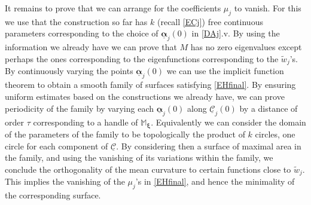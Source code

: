 \documentclass[12pt,namelimits,sumlimits]{amsart}
\theoremstyle{remark}
\numberwithin{equation}{section}
\begin{document}
It remains to prove that we can arrange for the coefficients $\mu_j$ to vanish.
For this we use that the construction so far has $k$
(recall \ref{ECj})
free continuous parameters corresponding to the choice of 
${\underline{\boldsymbol{\alpha}}}_j(0)$ in \ref{DAj}.v.
By using the information we already have we can prove that $M$ has
no zero eigenvalues except perhaps the ones corresponding to the eigenfunctions
corresponding to the $\widetilde{w}_j$'s.
By continuously varying the points ${\underline{\boldsymbol{\alpha}}}_j(0)$ we can use the implicit function theorem to obtain a smooth
family of surfaces satisfying \ref{EHfinal}.
By ensuring uniform estimates based on the constructions we already have,
we can prove
periodicity of the family by varying each ${\underline{\boldsymbol{\alpha}}}_j(0)$ along ${\underline{{\mathcal{C}}}}_j(0)$
by a distance of order $\tau$ corresponding to a handle of ${\mathbb{M}}_{{\boldsymbol{\xi}}}$.
Equivalently we can consider the domain of the parameters of the family to be topologically the product of $k$
circles, one circle for each component of ${\underline{{\mathcal{C}}}}$.
By considering then a surface of maximal area in the family,
and using the vanishing of its variations within the family,
we conclude the orthogonality of the mean curvature to certain functions close to $\widetilde{w}_j$.
This implies the vanishing of the $\mu_j$'s in \ref{EHfinal},
and hence the minimality of the corresponding surface.



\end{document}
